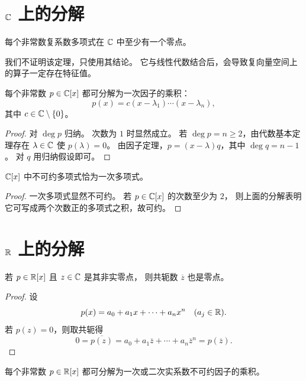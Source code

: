 \section{$\mathbb{C}$ 上的分解}

\begin{theorem}[代数基本定理，叙述]
每个非常数复系数多项式在 $\mathbb{C}$ 中至少有一个零点。
\end{theorem}

我们不证明该定理，只使用其结论。
它与线性代数结合后，会导致复向量空间上的算子一定存在特征值。

\begin{corollary}
每个非常数 $p\in\mathbb{C}[x]$ 都可分解为一次因子的乘积：
\[
p(x)=c(x-\lambda_1)\cdots(x-\lambda_n),
\]
其中 $c\in\mathbb{C}\setminus\{0\}$。
\end{corollary}

\begin{proof}
对 $\deg p$ 归纳。
次数为 $1$ 时显然成立。
若 $\deg p=n\ge 2$，由代数基本定理存在 $\lambda\in\mathbb{C}$ 使 $p(\lambda)=0$。
由因子定理，$p=(x-\lambda)q$，其中 $\deg q=n-1$。
对 $q$ 用归纳假设即可。
\end{proof}

\begin{corollary}
$\mathbb{C}[x]$ 中不可约多项式恰为一次多项式。
\end{corollary}

\begin{proof}
一次多项式显然不可约。
若 $p\in\mathbb{C}[x]$ 的次数至少为 $2$，
则上面的分解表明它可写成两个次数正的多项式之积，故可约。
\end{proof}

\section{$\mathbb{R}$ 上的分解}

\begin{proposition}
若 $p\in\mathbb{R}[x]$ 且 $z\in\mathbb{C}$ 是其非实零点，
则共轭数 $\overline z$ 也是零点。
\end{proposition}

\begin{proof}
设
\[
p(x)=a_0+a_1x+\cdots+a_nx^n
\quad (a_j\in\mathbb{R}).
\]
若 $p(z)=0$，则取共轭得
\[
0=\overline{p(z)}=a_0+a_1\overline z+\cdots+a_n\overline z^n=p(\overline z).
\]
\end{proof}

\begin{theorem}
每个非常数 $p\in\mathbb{R}[x]$ 都可分解为一次或二次实系数不可约因子的乘积。
\end{theorem}

